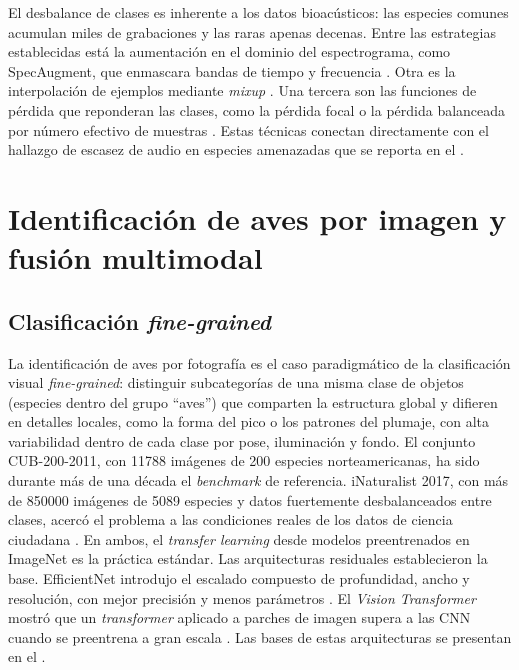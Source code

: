 El desbalance de clases es inherente a los datos bioacústicos: las especies
comunes acumulan miles de grabaciones y las raras apenas decenas. Entre las
estrategias establecidas está la aumentación en el dominio del
espectrograma, como SpecAugment, que enmascara bandas de tiempo y frecuencia
\citep{park2019specaugment}. Otra es la interpolación de ejemplos mediante
\textit{mixup} \citep{zhang2018mixup}. Una tercera son las funciones de
pérdida que reponderan las clases, como la pérdida focal
\citep{lin2017focal} o la pérdida balanceada por número efectivo de
muestras \citep{cui2019classbalanced}. Estas técnicas conectan directamente con el
hallazgo de escasez de audio en especies amenazadas que se reporta en el
.

\section{Identificación de aves por imagen y fusión multimodal}
\label{sec:rel-imagen}

\subsection*{Clasificación \textit{fine-grained}}

La identificación de aves por fotografía es el caso paradigmático de la
clasificación visual \textit{fine-grained}: distinguir subcategorías de una
misma clase de objetos (especies dentro del grupo ``aves'') que comparten la
estructura global y difieren en detalles locales, como la forma del pico o
los patrones del plumaje, con alta variabilidad dentro de cada clase por
pose, iluminación y fondo. El conjunto
CUB-200-2011, con \num{11788} imágenes de 200 especies norteamericanas, ha
sido durante más de una década el \textit{benchmark} de referencia.
iNaturalist 2017, con más de \num{850000} imágenes de \num{5089} especies y
datos fuertemente desbalanceados entre clases, acercó el problema a las
condiciones reales de los datos de ciencia ciudadana
\citep{vanhorn2018inaturalist}. En ambos, el \textit{transfer learning}
desde modelos preentrenados en ImageNet es la práctica estándar. Las
arquitecturas residuales establecieron la base. EfficientNet introdujo el
escalado compuesto de profundidad, ancho y resolución, con mejor precisión y
menos parámetros \citep{tan2019efficientnet}. El \textit{Vision Transformer}
mostró que un \textit{transformer} aplicado a parches de imagen supera a las
CNN cuando se preentrena a gran escala \citep{dosovitskiy2021vit}. Las bases
de estas arquitecturas se presentan en el .

